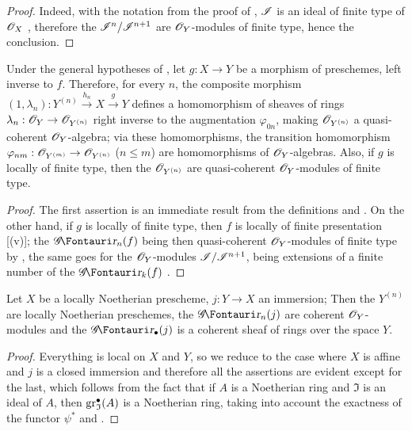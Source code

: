 \begin{proof}
Indeed, with the notation from the proof of , $\mathscr{I}$ is an ideal of finite type of $\mathscr{O}_X$ , therefore the $\mathscr{I}^n/\mathscr{I}^{n+1}$ are $\mathscr{O}_Y$-modules of finite type, hence the conclusion.
\end{proof}

\begin{corollary}[16.1.7]
\label{IV.16.1.7}
Under the general hypotheses of , let $g:X \to Y$ be a morphism of preschemes, left inverse to $f$.
Therefore, for every $n$, the composite morphism $(1, \lambda_n): Y^{(n)}\xrightarrow{h_n} X \xrightarrow{g} Y$ defines a homomorphism of sheaves of rings $\lambda_n: \sh{O}_Y \to \sh{O}_{Y^{(n)}}$ right inverse to the augmentation $\varphi_{0n}$, making $\mathscr{O}_{Y^{(n)}}$ a quasi-coherent $\mathscr{O}_Y$-algebra;
via these homomorphisms, the transition homomorphism $\varphi_{nm}:\sh{O}_{Y^{(m)}} \to \sh{O}_{Y^{(n)}}$ ($n\leq m$) are homomorphisms of $\mathscr{O}_Y$-algebras. 
Also, if $g$ is locally of finite type, then the $\mathscr{O}_{Y^{(n)}}$ are quasi-coherent $\mathscr{O}_Y$-modules of finite type.
\end{corollary}

\begin{proof}
The first assertion is an immediate result from the definitions and .
On the other hand, if $g$ is locally of finite type, then $f$ is locally of finite presentation [(v)];
the $\shGr_n(f)$ being then quasi-coherent $\mathscr{O}_Y$-modules of finite type by , the same goes for the $\mathscr{O}_Y$-modules $\mathscr{I}/\mathscr{I}^{n+1}$, being extensions of a finite number of the $\shGr_k(f)$ .
\end{proof}

\begin{proposition}[16.1.8]
\label{IV.16.1.8}
Let $X$ be a locally Noetherian prescheme, $j:Y \to X$ an immersion;
Then the $Y^{(n)}$ are locally Noetherian preschemes, the $\shGr_n(j)$ are coherent $\mathscr{O}_Y$-modules and the $\shGr_\bullet(j)$ is a coherent sheaf of rings over the space $Y$.
\end{proposition}

\begin{proof}
Everything is local on $X$ and $Y$, so we reduce to the case where $X$ is affine and $j$ is a closed immersion and therefore all the assertions are evident except for the last, which follows from the fact that if $A$ is a Noetherian ring and $\mathfrak{I}$ is an ideal of $A$, then $\operatorname{gr}_\mathfrak{I}^\bullet(A)$ is a Noetherian ring, taking into account the exactness of the functor $\psi^*$ and .
\end{proof}

